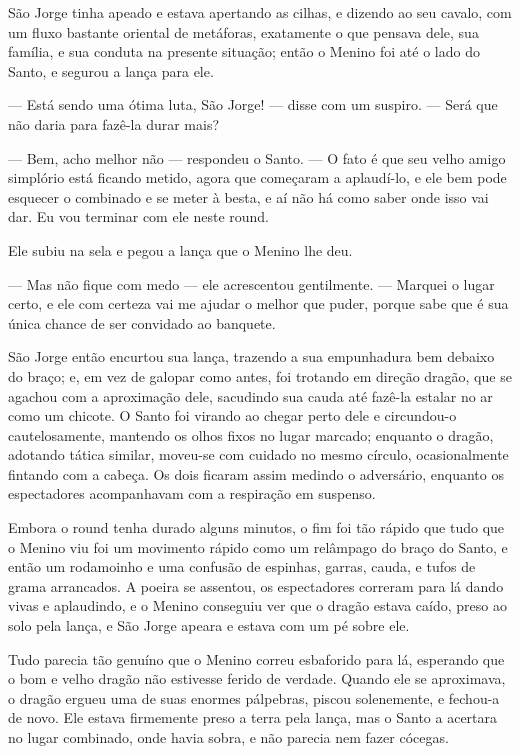 São Jorge tinha apeado e estava apertando as cilhas, e dizendo ao seu
cavalo, com um fluxo bastante oriental de metáforas, exatamente o que
pensava dele, sua família, e sua conduta na presente situação; então
o Menino foi até o lado do Santo, e segurou a lança para ele.

— Está sendo uma ótima luta, São Jorge! — disse com um suspiro. — Será
que não daria para fazê-la durar mais? 

— Bem, acho melhor não — respondeu o Santo. — O fato é que seu velho
amigo simplório está ficando metido, agora que começaram a
aplaudí-lo, e ele bem pode esquecer o combinado e se meter à besta, e
aí não há como saber onde isso vai dar. Eu vou terminar com ele neste
round.

Ele subiu na sela e pegou a lança que o Menino lhe deu.

— Mas não fique com medo — ele acrescentou gentilmente. — Marquei o
lugar certo, e ele com certeza vai me ajudar o melhor que puder,
porque sabe que é sua única chance de ser convidado ao banquete.

São Jorge então encurtou sua lança, trazendo a sua empunhadura bem
debaixo do braço; e, em vez de galopar como antes, foi trotando em
direção dragão, que se agachou com a aproximação dele, sacudindo sua
cauda até fazê-la estalar no ar como um chicote. O Santo foi virando
ao chegar perto dele e circundou-o cautelosamente, mantendo os olhos
fixos no lugar marcado; enquanto o dragão, adotando tática similar,
moveu-se com cuidado no mesmo círculo, ocasionalmente fintando com a
cabeça. Os dois ficaram assim medindo o adversário, enquanto os
espectadores acompanhavam com a respiração em suspenso.

Embora o round tenha durado alguns minutos, o fim foi tão rápido que
tudo que o Menino viu foi um movimento rápido como um relâmpago do
braço do Santo, e então um rodamoinho e uma confusão de espinhas,
garras, cauda, e tufos de grama arrancados. A poeira se assentou, os
espectadores correram para lá dando vivas e aplaudindo, e o Menino
conseguiu ver que o dragão estava caído, preso ao solo pela lança, e
São Jorge apeara e estava com um pé sobre ele.

Tudo parecia tão genuíno que o Menino correu esbaforido para lá,
esperando que o bom e velho dragão não estivesse ferido de verdade.
Quando ele se aproximava, o dragão ergueu uma de suas enormes
pálpebras, piscou solenemente, e fechou-a de novo. Ele estava
firmemente preso a terra pela lança, mas o Santo a acertara no lugar
combinado, onde havia sobra, e não parecia nem fazer cócegas.

